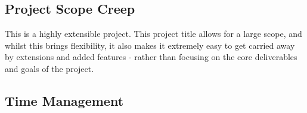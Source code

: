 \documentclass[report,10pt]{article}
\begin{document}
\subsection{Project Scope Creep}
This is a highly extensible project. This project title allows for a large scope, and whilst this brings flexibility, it also makes it extremely easy to get carried away by extensions and added features - rather than focusing on the core deliverables and goals of the project.
\subsection{Time Management}

\pagebreak


\end{document}
